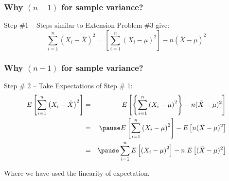 \begin{frame}
\frametitle{Why $(n-1)$ for sample variance?}
\begin{block}{Step \#1 -- Steps similar to Extension Problem \#3 give:}
	$$\sum_{i=1}^n \left(X_i - \bar{X}\right)^2 = \left[  \sum_{i=1}^n \left(X_i - \mu\right)^2\right] - n(\bar{X}-\mu)^2$$
\end{block}

\end{frame}
%

\begin{frame}
\frametitle{Why $(n-1)$ for sample variance?}
\begin{block}{Step \# 2 -- Take Expectations of Step \# 1:}
	\begin{eqnarray*}
		E\left[\sum_{i=1}^n \left(X_i - \bar{X}\right)^2\right] &=& E\left[\left\{  \sum_{i=1}^n \left(X_i - \mu\right)^2\right\} - n(\bar{X}-\mu)^2\right]\\
			&=&\pause E\left[ \sum_{i=1}^n \left(X_i - \mu\right)^2\right] -E\left[ n(\bar{X}-\mu)^2\right]\\
			&=&\pause  \sum_{i=1}^n E\left[\left(X_i - \mu\right)^2\right] -n\;E\left[ (\bar{X}-\mu)^2\right]\\
	\end{eqnarray*}
\end{block}
\alert{Where we have used the linearity of expectation.}
\end{frame}


